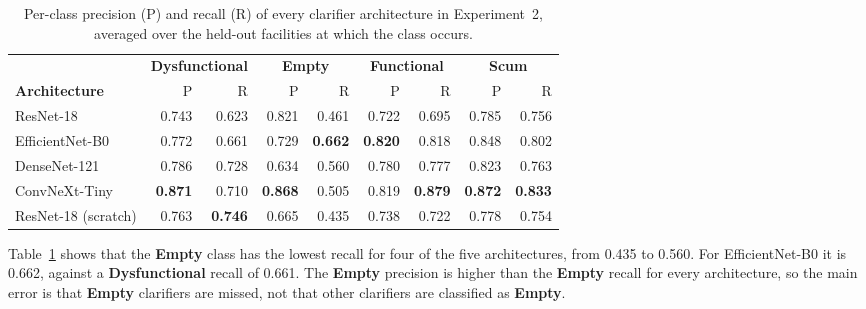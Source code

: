 \begin{table}[htbp]
\centering
\setlength{\tabcolsep}{3pt}
\caption{Per-class precision (P) and recall (R) of every clarifier architecture in Experiment~2, averaged over the held-out facilities at which the class occurs.}
\label{tab:res_lofo_clarifier_perclass}
\begin{tabular}{l rr rr rr rr}
\toprule
& \multicolumn{2}{c}{\textbf{Dysfunctional}} & \multicolumn{2}{c}{\textbf{Empty}} & \multicolumn{2}{c}{\textbf{Functional}} & \multicolumn{2}{c}{\textbf{Scum}} \\
\cmidrule(lr){2-3} \cmidrule(lr){4-5} \cmidrule(lr){6-7} \cmidrule(lr){8-9}
\textbf{Architecture} & P & R & P & R & P & R & P & R \\
\midrule
ResNet-18 & 0.743 & 0.623 & 0.821 & 0.461 & 0.722 & 0.695 & 0.785 & 0.756 \\
EfficientNet-B0 & 0.772 & 0.661 & 0.729 & \textbf{0.662} & \textbf{0.820} & 0.818 & 0.848 & 0.802 \\
DenseNet-121 & 0.786 & 0.728 & 0.634 & 0.560 & 0.780 & 0.777 & 0.823 & 0.763 \\
ConvNeXt-Tiny & \textbf{0.871} & 0.710 & \textbf{0.868} & 0.505 & 0.819 & \textbf{0.879} & \textbf{0.872} & \textbf{0.833} \\
ResNet-18 (scratch) & 0.763 & \textbf{0.746} & 0.665 & 0.435 & 0.738 & 0.722 & 0.778 & 0.754 \\
\bottomrule
\end{tabular}
\end{table}

Table~\ref{tab:res_lofo_clarifier_perclass} shows that the \textbf{Empty} class has the lowest recall for four of the five architectures, from 0.435 to 0.560. For EfficientNet-B0 it is 0.662, against a \textbf{Dysfunctional} recall of 0.661. The \textbf{Empty} precision is higher than the \textbf{Empty} recall for every architecture, so the main error is that \textbf{Empty} clarifiers are missed, not that other clarifiers are classified as \textbf{Empty}.

